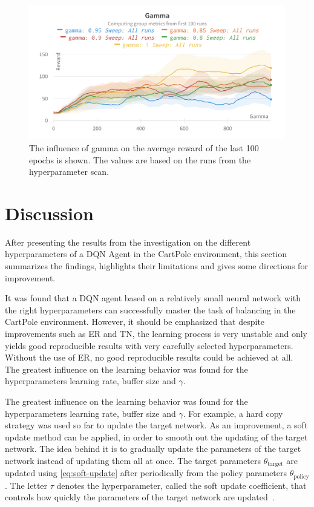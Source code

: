 \documentclass{article}
\begin{document}
\begin{figure}[ht!]
   \centering
   \includegraphics[width=\columnwidth]{assets/hyperparamter-scan/W&B Chart Gamma.png}
   \caption{The influence of gamma on the average reward of the last 100 epochs is shown. The values are based on the runs from the hyperparameter scan.
   }
   \label{fig:hyperparameter_scan_isolated_gamma}
\end{figure}

\section{Discussion}
\label{sec:discussion}
After presenting the results from the investigation on the different hyperparameters of a DQN Agent in the CartPole environment, this section summarizes the findings, highlights their limitations and gives some directions for improvement.

It was found that a DQN agent based on a relatively small neural network with the right hyperparameters can successfully master the task of balancing in the CartPole environment. 
However, it should be emphasized that despite improvements such as ER and TN, the learning process is very unstable and only yields good reproducible results with very carefully selected hyperparameters. 
Without the use of ER, no good reproducible results could be achieved at all. 
The greatest influence on the learning behavior was found for the hyperparameters learning rate, buffer size and $\gamma$. 

The greatest influence on the learning behavior was found for the hyperparameters learning rate, buffer size and $\gamma$. 
For example, a hard copy strategy was used so far to update the target network. 
As an improvement, a soft update method can be applied, in order to smooth out the updating of the target network.
The idea behind it is to gradually update the parameters of the target network instead of updating them all at once.
The target parameters $\theta_{\text{target}}$ are updated using \autoref{eq:soft-update} after periodically from the policy parameters $\theta_{\text{policy}}$.
The letter $\tau$ denotes the hyperparameter, called the soft update coefficient, that controls how quickly the parameters of
the target network are updated~\cite{kobayashi2021t}.
\end{document}
